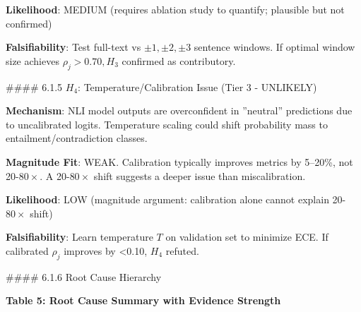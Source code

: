 \textbf{Likelihood}: MEDIUM (requires ablation study to quantify; plausible but not confirmed)

\textbf{Falsifiability}: Test full-text vs $\pm 1, \pm 2, \pm 3$ sentence windows. If optimal window size achieves $\rho_j > 0.70, H_3$ confirmed as contributory.

\#\#\#\# 6.1.5 $H_4$: Temperature/Calibration Issue (Tier 3 - UNLIKELY)

\textbf{Mechanism}: NLI model outputs are overconfident in ''neutral'' predictions due to uncalibrated logits. Temperature scaling could shift probability mass to entailment/contradiction classes.

\textbf{Magnitude Fit}: WEAK. Calibration typically improves metrics by 5--20\%, not 20-$80\times$. A 20-$80\times$ shift suggests a deeper issue than miscalibration.

\textbf{Likelihood}: LOW (magnitude argument: calibration alone cannot explain 20-$80\times$ shift)

\textbf{Falsifiability}: Learn temperature $T$ on validation set to minimize ECE. If calibrated $\rho_j$ improves by <0.10, $H_4$ refuted.

\#\#\#\# 6.1.6 Root Cause Hierarchy

\textbf{Table 5: Root Cause Summary with Evidence Strength}

\begin{table}[htbp]
\centering
{}
\end{table}

